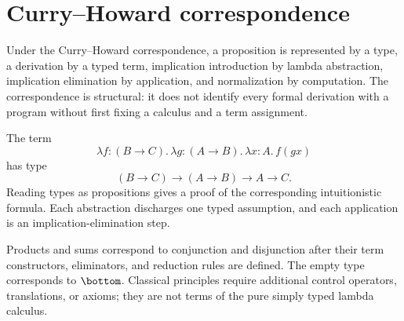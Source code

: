 \section{Curry--Howard correspondence}
\label{sec:normalization-curry-howard-03}

Under the Curry--Howard correspondence, a proposition is represented by a
type, a derivation by a typed term, implication introduction by lambda
abstraction, implication elimination by application, and normalization by
computation.  The correspondence is structural: it does not identify every
formal derivation with a program without first fixing a calculus and a
term assignment.

\begin{example}[Composition]
The term
\[
  \lambda f{:}(B\to C).\,
  \lambda g{:}(A\to B).\,
  \lambda x{:}A.\,f(gx)
\]
has type
\[
  (B\to C)\to(A\to B)\to A\to C.
\]
Reading types as propositions gives a proof of the corresponding intuitionistic
formula.  Each abstraction discharges one typed assumption, and each
application is an implication-elimination step.
\end{example}

Products and sums correspond to conjunction and disjunction after their term
constructors, eliminators, and reduction rules are defined.  The empty type
corresponds to \(\bottom\).  Classical principles require additional control
operators, translations, or axioms; they are not terms of the pure simply
typed lambda calculus.

